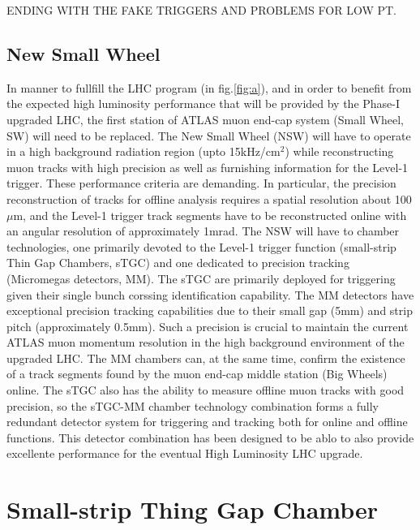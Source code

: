 ENDING WITH THE FAKE TRIGGERS AND PROBLEMS FOR LOW PT.\par 



\subsection{New Small Wheel}

In manner to fullfill the LHC program (in fig.\ref{fig:a}), and in order to benefit from the expected high luminosity performance that will be provided by the Phase-I upgraded LHC, 
the first station of ATLAS muon end-cap system (Small Wheel, SW) will need to be replaced. 
The New Small Wheel (NSW) will have to operate in a high background radiation region (upto 15kHz/cm$^2$) while reconstructing muon tracks with high precision as well as furnishing 
information for the Level-1 trigger. These performance criteria are demanding. In particular, the precision reconstruction of tracks for offline analysis requires a spatial resolution about 100 $\mu$m, and the Level-1 trigger track segments have to be reconstructed online with an angular resolution of approximately 1mrad. The NSW will have to chamber technologies, one primarily devoted to the Level-1 trigger function (small-strip Thin Gap Chambers, sTGC) and one dedicated to precision tracking (Micromegas detectors, MM). The sTGC are primarily deployed for triggering given their single bunch corssing identification capability. The MM detectors have exceptional precision tracking capabilities due to their small gap (5mm) and strip pitch (approximately 0.5mm). Such a precision is crucial to maintain the current ATLAS muon momentum resolution in the high background environment of the upgraded LHC. The MM chambers can, at the same time, confirm the existence of a track segments found by the muon end-cap middle station (Big Wheels) online. The sTGC also has the ability to measure offline muon tracks with good precision, so the sTGC-MM chamber technology combination forms a fully redundant detector system for triggering and tracking both for online and offline functions. This detector combination has been designed to be ablo to also provide excellente performance for the eventual High Luminosity LHC upgrade.\par 



\section{Small-strip Thing Gap Chamber}

